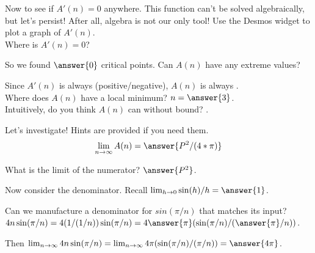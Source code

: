 \documentclass[handout,nooutcomes]{ximera}
\begin{document}
\bigskip

\hspace{2cm}Now to see if $A'(n)=0$ anywhere. This function can't be solved algebraically, but let's persist! After all, algebra is not our only tool! Use the Desmos widget to plot a graph of $A'(n)$.\\
\graph[panel]{}
Where is $A'(n)=0$?\\
\begin{multipleChoice}
\end{multipleChoice}

\bigskip

So we found $\answer{0}$ critical points. Can $A(n)$ have any extreme values?\\
\begin{multipleChoice}
\end{multipleChoice}
Since $A'(n)$ is always (positive/negative), $A(n)$ is always .\\
Where does $A(n)$ have a local minimum? $n = \answer{3}$.\\
Intuitively, do you think $A(n)$ can  without bound? .\\ %

\medskip

\begin{exercise}
Let's investigate! Hints are provided if you need them.\\
\[\lim_{n \to \infty}A(n) = \answer{P^2/(4*\pi)}\]
\begin{hint}
	What is the limit of the numerator? $\answer{P^2}$.
\end{hint}
\begin{hint}
  Now consider the denominator. Recall $\lim_{h \to 0} \sin(h)/h = \answer{1}$.
\end{hint}
\begin{hint}
  Can we manufacture a denominator for $sin(\pi/n)$ that matches its input?\\
  $4n\sin(\pi/n) = 4(1/(1/n))\sin(\pi/n) = 4\answer{\pi}(\sin(\pi/n)/(\answer{\pi}/n))$.
\end{hint}
\begin{hint}
  Then $\lim_{n \to \infty} 4n\sin(\pi/n) = \lim_{n \to \infty} 4\pi(\sin(\pi/n)/(\pi/n)) = \answer{4\pi}$.
\end{hint}
\end{exercise}
\end{document}

